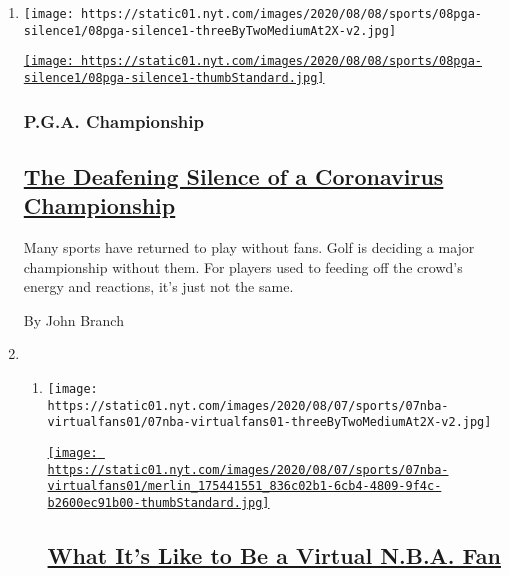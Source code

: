 \begin{enumerate}
\def\labelenumi{\arabic{enumi}.}
\item
  \texttt{[image: https://static01.nyt.com/images/2020/08/08/sports/08pga-silence1/08pga-silence1-threeByTwoMediumAt2X-v2.jpg]}

  \href{/2020/08/08/sports/golf/pga-championship-scores.html}{\texttt{[image: https://static01.nyt.com/images/2020/08/08/sports/08pga-silence1/08pga-silence1-thumbStandard.jpg]}}

  \hypertarget{pga-championship}{%
  \subsubsection{P.G.A. Championship}\label{pga-championship}}

  \hypertarget{the-deafening-silence-of-a-coronavirus-championship}{%
  \subsection{\texorpdfstring{\href{/2020/08/08/sports/golf/pga-championship-scores.html}{The
  Deafening Silence of a Coronavirus
  Championship}}{The Deafening Silence of a Coronavirus Championship}}\label{the-deafening-silence-of-a-coronavirus-championship}}

  Many sports have returned to play without fans. Golf is deciding a
  major championship without them. For players used to feeding off the
  crowd's energy and reactions, it's just not the same.

  By John Branch
\item
  \begin{enumerate}
  \def\labelenumii{\arabic{enumii}.}
  \item
    \texttt{[image: https://static01.nyt.com/images/2020/08/07/sports/07nba-virtualfans01/07nba-virtualfans01-threeByTwoMediumAt2X-v2.jpg]}

    \href{/2020/08/07/sports/basketball/nba-virtual-fans.html}{\texttt{[image: https://static01.nyt.com/images/2020/08/07/sports/07nba-virtualfans01/merlin\_175441551\_836c02b1-6cb4-4809-9f4c-b2600ec91b00-thumbStandard.jpg]}}

    \hypertarget{what-its-like-to-be-a-virtual-nba-fan}{%
    \subsection{\texorpdfstring{\href{/2020/08/07/sports/basketball/nba-virtual-fans.html}{What
    It's Like to Be a Virtual N.B.A.
    Fan}}{What It's Like to Be a Virtual N.B.A. Fan}}\label{what-its-like-to-be-a-virtual-nba-fan}}


\end{enumerate}
\end{enumerate}
